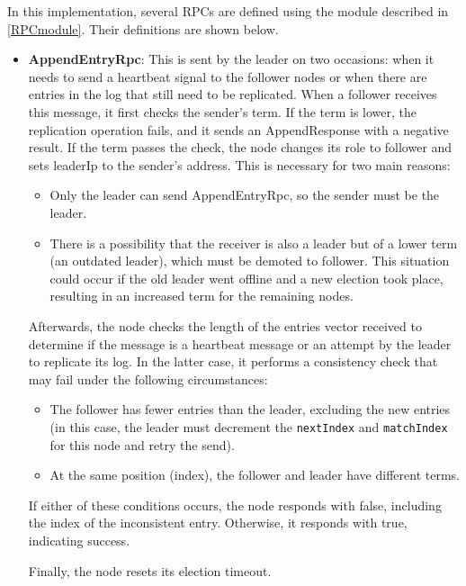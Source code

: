 In this implementation, several RPCs are defined using the module described in \ref{RPCmodule}. 
Their definitions are shown below.
\begin{itemize}
  \item \textbf{AppendEntryRpc}: This is sent by the leader on two occasions: when it needs
    to send a heartbeat signal to the follower nodes or when there are entries in the log 
    that still need to be replicated.
    When a follower receives this message, it first checks the sender’s term. If the term 
    is lower, the replication operation fails, and it sends an AppendResponse with a negative 
    result. If the term passes the check, the node changes its role to follower and sets 
    leaderIp to the sender’s address. This is necessary for two main reasons:
    \begin{itemize}
      \item Only the leader can send AppendEntryRpc, so the sender must be the leader.
      \item There is a possibility that the receiver is also a leader but of a lower 
        term (an outdated leader), which must be demoted to follower. This situation 
        could occur if the old leader went offline and a new election took place, 
        resulting in an increased term for the remaining nodes.
    \end{itemize}
    Afterwards, the node checks the length of the entries vector received to determine 
    if the message is a heartbeat message or an attempt by the leader to replicate its log. 
    In the latter case, it performs a consistency check that may fail under the following 
    circumstances:
    \begin{itemize}
      \item The follower has fewer entries than the leader, excluding the new entries 
        (in this case, the leader must decrement the \texttt{nextIndex} and \texttt{matchIndex} for this 
        node and retry the send).
      \item At the same position (index), the follower and leader have different terms. 
    \end{itemize}
    If either of these conditions occurs, the node responds with false, including 
    the index of the inconsistent entry. Otherwise, it responds with true, indicating success.
        
    Finally, the node resets its election timeout.


\end{itemize}
